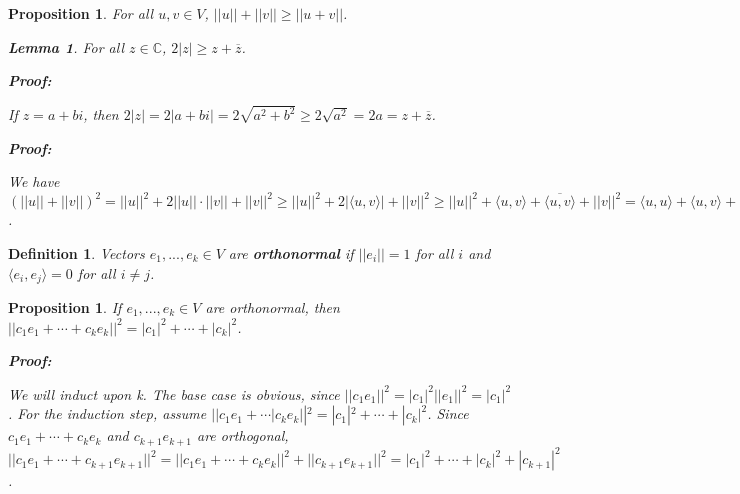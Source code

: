 \documentclass{article}
\theoremstyle{colontheorem}
\newtheorem{proposition}[theorem]{Proposition}
\newtheorem{definition}[theorem]{Definition}
\newtheorem{lemma}{Lemma}[theorem]
\newenvironment{Proposition}
{
	\begin{mdframed}[backgroundcolor=PropPink!10]
	\begin{proposition}
}
{
	\end{proposition}
	\end{mdframed}
	
	\vspace{.15in}
}
\newenvironment{Def}
{
	\begin{mdframed}[backgroundcolor=DefGreen!10]
	\begin{definition}
}
{
	\end{definition}
	\end{mdframed}
	
	\vspace{.15in}
}
\newenvironment{Lemma}
{
	\begin{mdframed}[backgroundcolor=LemmaYellow!10]
	\begin{lemma}
}
{
	\end{lemma}
	\end{mdframed}
	
	\vspace{.03in}
}
\newenvironment{Proof}
{
	\begin{mdframed}[backgroundcolor=ProofPurple!10]
	\textbf{Proof:}%
}
{
	\end{mdframed}
	
	\vspace{.085in}
}
\begin{document}
\begin{Proposition}
	
	For all $u, v \in V$, $||u|| + ||v|| \geq ||u + v||$.
	
	\begin{Lemma}
		
		For all $z \in \mathbb{C}$, $2|z| \geq z + \overline{z}$.
		
		\begin{Proof}
			If $z = a+bi$, then $2|z| = 2|a+bi| = 2\sqrt{a^2 + b^2} \geq 2\sqrt{a^2} = 2a = z + \overline{z}$.
			
		\end{Proof}
		
	\end{Lemma}
	
	\begin{Proof}
		We have $\left( ||u|| + ||v|| \right)^2 = ||u||^2 + 2||u|| \cdot ||v|| + ||v||^2 \geq ||u||^2 + 2 | \langle u, v \rangle | + ||v||^2 \geq ||u||^2 + \langle u, v \rangle + \overline{\langle u, v \rangle} + ||v||^2 = \langle u, u \rangle + \langle u, v \rangle + \langle v, u \rangle + \langle v, v \rangle = \langle u + v, u + v \rangle = ||u + v||^2$.
		
	\end{Proof}

\end{Proposition}



\begin{Def}
	
	Vectors $e_1, ..., e_k \in V$ are \textbf{orthonormal} if $||e_i|| = 1$ for all $i$ and $\langle e_i, e_j \rangle = 0$ for all $i \neq j$.
	
\end{Def}



\begin{Proposition}
	
	If $e_1, ..., e_k \in V$ are orthonormal, then $||c_1 e_1 + \cdots + c_k e_k||^2 = |c_1|^2 + \cdots + |c_k|^2$.
	
	\begin{Proof}
		We will induct upon k. The base case is obvious, since $||c_1 e_1||^2 = |c_1|^2 ||e_1||^2 = |c_1|^2$. For the induction step, assume $||c_1 e_1 + \cdots | c_k e_k||^2 = |c_1|^2 + \cdots + |c_k|^2$. Since $c_1 e_1 + \cdots + c_k e_k$ and $c_{k+1} e_{k+1}$ are orthogonal, $||c_1 e_1 + \cdots + c_{k+1} e_{k+1}||^2 = ||c_1 e_1 + \cdots + c_k e_k||^2 + ||c_{k+1} e_{k+1}||^2 = |c_1|^2 + \cdots + |c_k|^2 + |c_{k+1}|^2$.
		
	\end{Proof}
	
\end{Proposition}
\end{document}
